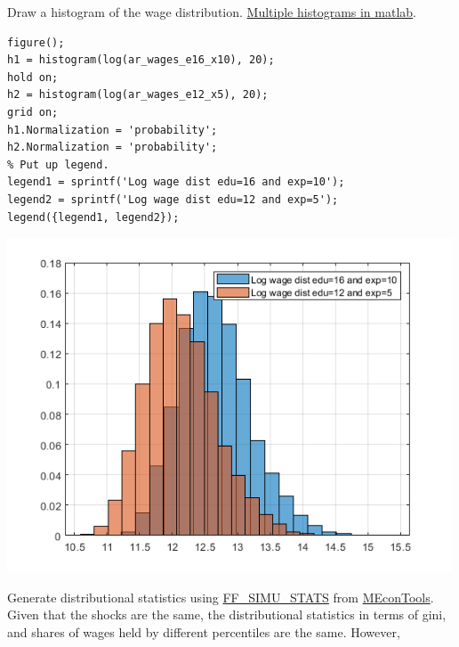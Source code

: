 \documentclass[
]{book}
\begin{document}
Draw a histogram of the wage distribution. \href{https://www.mathworks.com/help/matlab/ref/matlab.graphics.chart.primitive.histogram.html}{Multiple histograms in
matlab}.

\begin{verbatim}
figure();
h1 = histogram(log(ar_wages_e16_x10), 20);
hold on;
h2 = histogram(log(ar_wages_e12_x5), 20);
grid on;
h1.Normalization = 'probability';
h2.Normalization = 'probability';
% Put up legend.
legend1 = sprintf('Log wage dist edu=16 and exp=10');
legend2 = sprintf('Log wage dist edu=12 and exp=5');
legend({legend1, legend2});
\end{verbatim}

\includegraphics[width=5.20833in,height=\textheight]{img/fs_wage_equation_images/figure_1.png}

Generate distributional statistics using
\href{https://fanwangecon.github.io/MEconTools/MEconTools/doc/stats/htmlpdfm/fx_simu_stats.html}{FF\_SIMU\_STATS}
from \href{https://fanwangecon.github.io/MEconTools/}{MEconTools}. Given that
the shocks are the same, the distributional statistics in terms of gini,
and shares of wages held by different percentiles are the same. However,
\end{document}
